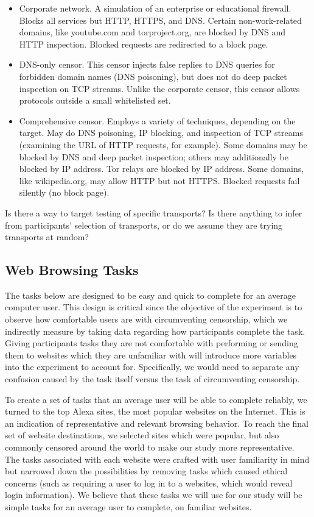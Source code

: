 \documentclass[letterpaper,twocolumn,10pt]{article}
\begin{document}
\begin{itemize} \itemsep1pt \parskip0pt 
\item{Corporate network.}
A simulation of an enterprise or educational firewall.
Blocks all services but HTTP, HTTPS, and DNS.
Certain non-work-related domains, like youtube.com and torproject.org,
are blocked by DNS and HTTP inspection.
Blocked requests are redirected to a block page.
\item{DNS-only censor.}
This censor injects false replies to DNS queries
for forbidden domain names (DNS poisoning),
but does not do deep packet inspection on TCP streams.
Unlike the corporate censor, this censor allows protocols
outside a small whitelisted set.
\item{Comprehensive censor.}
Employs a variety of techniques, depending on the target.
May do DNS poisoning, IP blocking, and inspection of TCP streams
(examining the URL of HTTP requests, for example).
Some domains may be blocked by DNS and deep packet inspection;
others may additionally be blocked by IP address.
Tor relays are blocked by IP address.
Some domains, like wikipedia.org, may allow HTTP but not HTTPS.
Blocked requests fail silently (no block page).
\end{itemize}

Is there a way to target testing of specific transports?
Is there anything to infer from participants' selection of transports, 
or do we assume they are trying transports at random?

\subsection{Web Browsing Tasks}
The tasks below are designed to be easy and quick to complete for an average
computer user. This design is critical since the objective of the experiment is to observe
how comfortable users are with circumventing censorship, which we indirectly measure
by taking data regarding how participants complete the task. Giving participants tasks 
they are not comfortable with performing or sending them to websites which they are 
unfamiliar with will introduce more variables into the experiment to account for. 
Specifically, we would need to separate any confusion caused by the task itself versus
the task of circumventing censorship. 

To create a set of tasks that an average user will be able to complete reliably, 
we turned to the top Alexa sites, the most popular websites on the Internet. This 
is an indication of representative and relevant browsing behavior. To reach the final
set of website destinations, we selected sites which were popular, but also commonly
censored around the world to make our study more representative. The tasks 
associated with each website were crafted with user familiarity in mind but narrowed 
down the possibilities by removing tasks which caused ethical concerns (such as 
requiring a user to log in to a websites, which would reveal login information).  
We believe that these tasks we will use for our study will be simple tasks for an average 
user to complete, on familiar websites. 
\end{document}
